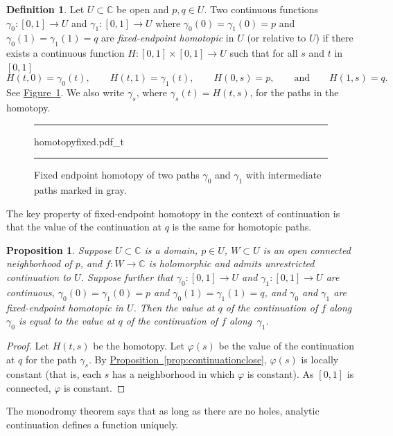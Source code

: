 \documentclass[12pt,openany]{book}
\newcommand{\C}{{\mathbb{C}}}
\newcommand{\myindex}[1]{#1\index{#1}}
\theoremstyle{plain}
\newtheorem{prop}[thm]{Proposition}
\theoremstyle{remark}
\theoremstyle{definition}
\newtheorem{defn}[thm]{Definition}
\newenvironment{myfig}{%
\begin{figure}[h!t]
\noindent\rule{\textwidth}{0.5pt}\vspace{12pt}\par\centering}%
{\par\noindent\rule{\textwidth}{0.5pt}
\end{figure}}
\theoremstyle{exercise}
\theoremstyle{example}
\newcommand{\figureref}[1]{\hyperref[#1]{Figure~\ref*{#1}}}
\newcommand{\propref}[1]{\hyperref[#1]{Proposition~\ref*{#1}}}
\begin{document}
\begin{defn}
Let $U \subset \C$ be open and $p,q \in U$.
Two continuous functions
$\gamma_0 \colon [0,1] \to U$ and
$\gamma_1 \colon [0,1] \to U$ where
$\gamma_0(0)=\gamma_1(0)=p$
and
$\gamma_0(1)=\gamma_1(1)=q$
are
\emph{\myindex{fixed-endpoint homotopic}} in $U$
(or relative to $U$) if there exists a continuous function
$H \colon [0,1] \times [0,1] \to U$ such that
for all $s$ and $t$ in $[0,1]$
\begin{equation*}
H(t,0) = \gamma_0(t), \qquad
H(t,1) = \gamma_1(t), \qquad
H(0,s) = p, \qquad
\text{and} \qquad
H(1,s) = q .
\end{equation*}
See \figureref{fig:homotopyfixed}.
We also write $\gamma_s$, where $\gamma_s(t) = H(t,s)$, for the paths in the homotopy.
\end{defn}

\begin{myfig}
{homotopyfixed.pdf_t}
\caption{Fixed endpoint homotopy of two paths $\gamma_0$ and
$\gamma_1$ with intermediate paths marked in gray.\label{fig:homotopyfixed}}
\end{myfig}

The key property of fixed-endpoint homotopy in the context of continuation is that 
the value of the continuation at $q$ is the same for homotopic paths.

\begin{prop}
\pagebreak[2]
Suppose $U \subset \C$ is a domain,
$p \in U$,
$W \subset U$ is an open connected neighborhood of $p$,
and $f \colon W \to \C$ is holomorphic and admits unrestricted continuation
to $U$.  Suppose further that
$\gamma_0 \colon [0,1] \to U$ and
$\gamma_1 \colon [0,1] \to U$ are continuous, $\gamma_0(0)=\gamma_1(0)=p$
and
$\gamma_0(1)=\gamma_1(1)=q$, and $\gamma_0$ and $\gamma_1$ are fixed-endpoint
homotopic in $U$.
Then the value at $q$ of the continuation of $f$ along $\gamma_0$ is equal to the
value at $q$ of the continuation of $f$ along~$\gamma_1$.
\end{prop}

\begin{proof}
Let $H(t,s)$ be the homotopy.
Let $\varphi(s)$ be the value of the continuation at $q$ for the path
$\gamma_s$.
By \propref{prop:continuationclose}, $\varphi(s)$ is locally constant (that
is, each $s$ has a neighborhood in which $\varphi$ is constant).  
As $[0,1]$ is connected, $\varphi$ is constant.
\end{proof}

The monodromy theorem says that as long as there are
no holes, analytic continuation defines a function uniquely.
\end{document}

